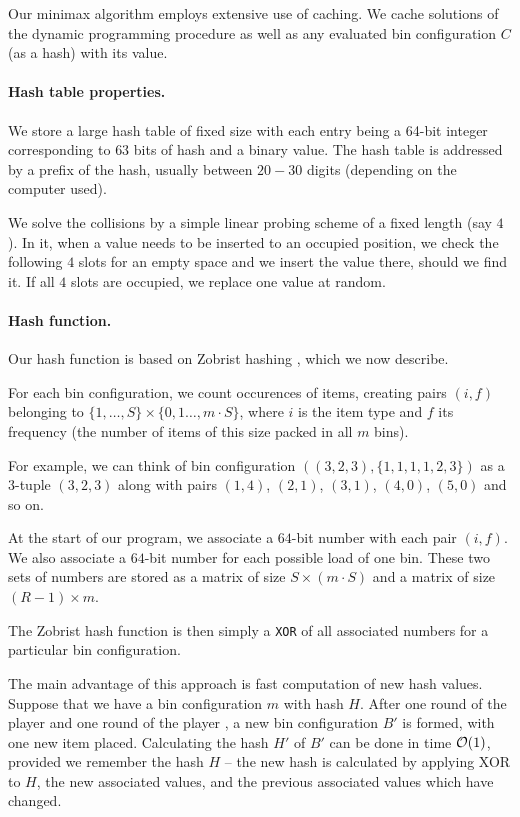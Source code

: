 Our minimax algorithm employs extensive use of caching. We cache
solutions of the dynamic programming procedure \MaxFeas as well as any
evaluated bin configuration $C$ (as a hash) with its value.

\paragraph{Hash table properties.} We store a large hash table of
fixed size with each entry being a 64-bit integer corresponding to
$63$ bits of hash and a binary value. The hash table is addressed
by a prefix of the hash, usually between $20-30$ digits (depending
on the computer used).

We solve the collisions by a simple linear probing scheme of a fixed
length (say $4$). In it, when a value needs to be inserted to an
occupied position, we check the following $4$ slots for an empty space
and we insert the value there, should we find it. If all $4$ slots are
occupied, we replace one value at random.

\paragraph{Hash function.} Our hash function is based on Zobrist
hashing \cite{zobrist}, which we now describe.

For each bin configuration, we count occurences of items, creating
pairs $(i,f)$ belonging to $\{1,\ldots,S\} \times \{0,1\ldots,m\cdot S\}$, where $i$ is the item type
and $f$ its frequency (the number of items of this size packed in all $m$ bins).

For example, we can think of bin configuration
$((3,2,3),\{1,1,1,1,2,3\})$ as a $3$-tuple $(3,2,3)$ along with pairs
$(1,4)$, $(2,1)$, $(3,1)$, $(4,0)$, $(5,0)$ and so on.

At the start of our program, we associate a $64$-bit number with each
pair $(i,f)$. We also associate a $64$-bit number for each possible
load of one bin. These two sets of numbers are stored as a matrix of
size $S \times (m\cdot S)$ and a matrix of size $(R-1) \times m$.

The Zobrist hash function is then simply a \texttt{XOR} of all
associated numbers for a particular bin configuration.

The main advantage of this approach is fast computation of new hash
values.  Suppose that we have a bin configuration $m$ with hash
$H$. After one round of the player \adversary and one round of the
player \algo, a new bin configuration $B'$ is formed, with one new
item placed. Calculating the hash $H'$ of $B'$ can be done in time
${\mathcal{O}}(1)$, provided we remember the hash $H$ -- the new hash is
calculated by applying XOR to $H$, the new associated values, and the
previous associated values which have changed.

